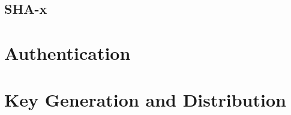\subsection{SHA-x}

\section{Authentication}\label{sec:sd:crypto:auth}

\section{Key Generation and Distribution}

